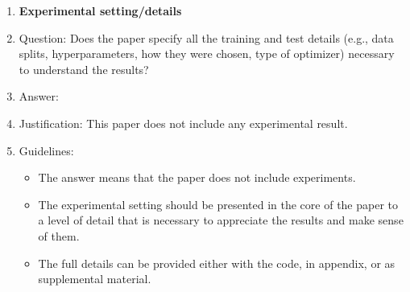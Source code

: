 \documentclass{article}
\theoremstyle{definition}
\theoremstyle{remark}
\begin{document}
\begin{enumerate}
\item {\bf Experimental setting/details}
    \item[] Question: Does the paper specify all the training and test details (e.g., data splits, hyperparameters, how they were chosen, type of optimizer) necessary to understand the results?
    \item[] Answer:  \answerNA{} %
    \item[] Justification: This paper does not include any experimental result.
    \item[] Guidelines:
    \begin{itemize}
        \item The answer \answerNA{} means that the paper does not include experiments.
        \item The experimental setting should be presented in the core of the paper to a level of detail that is necessary to appreciate the results and make sense of them.
        \item The full details can be provided either with the code, in appendix, or as supplemental material.
    \end{itemize}


\end{enumerate}
\end{document}
